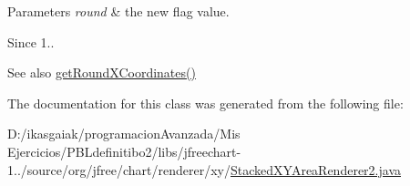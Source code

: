 \begin{DoxyParams}{Parameters}
{\em round} & the new flag value.\\
\hline
\end{DoxyParams}
\begin{DoxySince}{Since}
1..
\end{DoxySince}
\begin{DoxySeeAlso}{See also}
\mbox{\hyperlink{classorg_1_1jfree_1_1chart_1_1renderer_1_1xy_1_1_stacked_x_y_area_renderer2_ae89c0a904ba6f253d83ee8c642f76119}{get\+Round\+X\+Coordinates()}} 
\end{DoxySeeAlso}


The documentation for this class was generated from the following file\+:\begin{DoxyCompactItemize}
\item 
D\+:/ikasgaiak/programacion\+Avanzada/\+Mis Ejercicios/\+P\+B\+Ldefinitibo2/libs/jfreechart-\/1../source/org/jfree/chart/renderer/xy/\mbox{\hyperlink{_stacked_x_y_area_renderer2_8java}{Stacked\+X\+Y\+Area\+Renderer2.\+java}}\end{DoxyCompactItemize}
